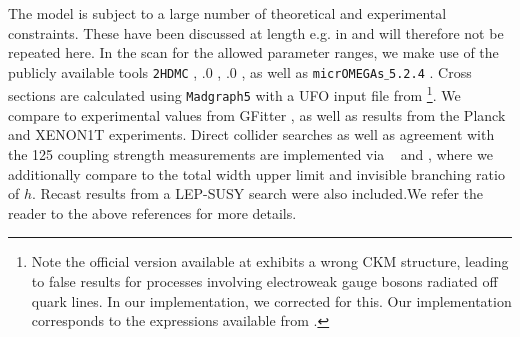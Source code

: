 The model is subject to a large number of theoretical and experimental constraints. These have been discussed at length e.g. in \cite{Ilnicka:2015jba,Ilnicka:2018def,Dercks:2018wch,Kalinowski:2018ylg,Kalinowski:2020rmb} and will therefore not be repeated here. In the scan for the allowed parameter ranges, we make use of the publicly available tools \texttt{2HDMC} \cite{Eriksson:2009ws},  .0 \cite{Bechtle:2008jh, Bechtle:2011sb, Bechtle:2013wla,Bechtle:2015pma,Bechtle:2020pkv}, .0 \cite{Bechtle:2013xfa,Bechtle:2020uwn}, as well as \texttt{micrOMEGAs$\_$5.2.4} \cite{Belanger:2020gnr}. Cross sections are calculated using  {\texttt{Madgraph5}} \cite{Alwall:2011uj} with a UFO input file from \cite{Goudelis:2013uca}\footnote{\label{foot:ufo} Note the official version available at \cite{ufo_idm} exhibits a wrong CKM structure, leading to false results for processes involving electroweak gauge bosons radiated off quark lines. In our implementation, we corrected for this. Our implementation corresponds to the expressions available from \cite{Zyla:2020zbs}.}. We compare to experimental values from GFitter \cite{gfitter,Haller:2018nnx}, as well as results from the Planck \cite{Aghanim:2018eyx} and XENON1T \cite{Aprile:2018dbl} experiments. Direct collider searches as well as agreement with the 125 \GeV coupling strength measurements are implemented via \HB~ and \HS, where we additionally compare to the total width upper limit  \cite{Sirunyan:2019twz} and invisible branching ratio \cite{ATLAS-CONF-2020-052} of $h$. Recast results from a LEP-SUSY search \cite{Lundstrom:2008ai} were also included.{We} refer {the reader} to the above references for more details.

